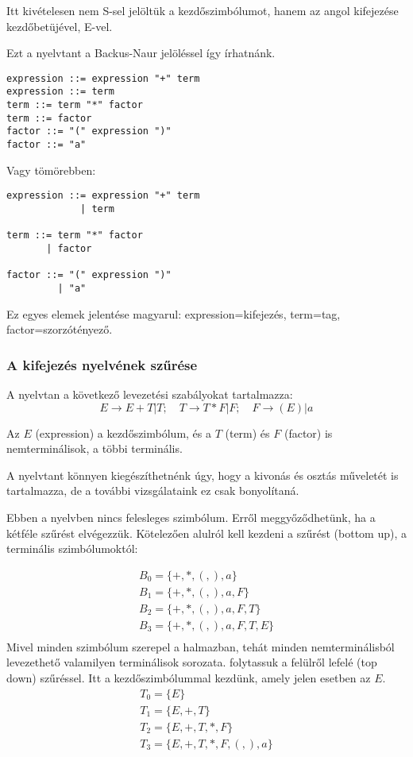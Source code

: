 \documentclass[a4paper]{article}
\begin{document}
Itt kivételesen nem S-sel jelöltük a kezdőszimbólumot, hanem az angol
kifejezése kezdőbetüjével, E-vel.

Ezt a nyelvtant a Backus-Naur jelöléssel így írhatnánk.

\vspace{1ex}
\begin{verbatim}
expression ::= expression "+" term
expression ::= term
term ::= term "*" factor
term ::= factor
factor ::= "(" expression ")"
factor ::= "a"
\end{verbatim}
\vspace{1ex}

Vagy tömörebben:

\vspace{1ex}
\begin{verbatim}
expression ::= expression "+" term
             | term

term ::= term "*" factor
       | factor

factor ::= "(" expression ")"
         | "a"
\end{verbatim}
\vspace{1ex}

Ez egyes elemek jelentése magyarul: expression=kifejezés, term=tag,
factor=szorzótényező.


\subsubsection{A kifejezés nyelvének szűrése}

A nyelvtan a következő levezetési szabályokat tartalmazza:
\[
 E\rightarrow E+T | T;\quad T\rightarrow T*F| F;\quad F\rightarrow (E)|a
\]

Az $E$ (expression) a kezdőszimbólum, és a $T$ (term) és $F$ (factor) is
nemterminálisok, a többi terminális.

A nyelvtant könnyen kiegészíthetnénk úgy, hogy a kivonás és osztás
műveletét is tartalmazza, de a további vizsgálataink ez csak
bonyolítaná.

Ebben a nyelvben nincs felesleges szimbólum. Erről meggyőződhetünk, ha a
kétféle szűrést elvégezzük. Kötelezően alulról kell kezdeni a szűrést
(bottom up), a
terminális szimbólumoktól:

\begin{eqnarray*}
    B_0 = \{+, *, (, ), a\} \\
    B_1 = \{+, *, (, ), a, F\} \\
    B_2 = \{+, *, (, ), a, F, T\} \\
    B_3 = \{+, *, (, ), a, F, T, E\} \\
\end{eqnarray*}
Mivel minden szimbólum szerepel a halmazban, tehát minden
nemterminálisból levezethető valamilyen terminálisok sorozata.
folytassuk a felülről lefelé (top down) szűréssel. Itt a
kezdőszimbólummal kezdünk, amely jelen esetben az $E$.
\begin{eqnarray*}
    T_0 = \{E\} \\
    T_1 = \{E, +, T\} \\
    T_2 = \{E, +, T, *, F\} \\
    T_3 = \{E, +, T, *, F, (, ), a\} \\
\end{eqnarray*}
\end{document}
